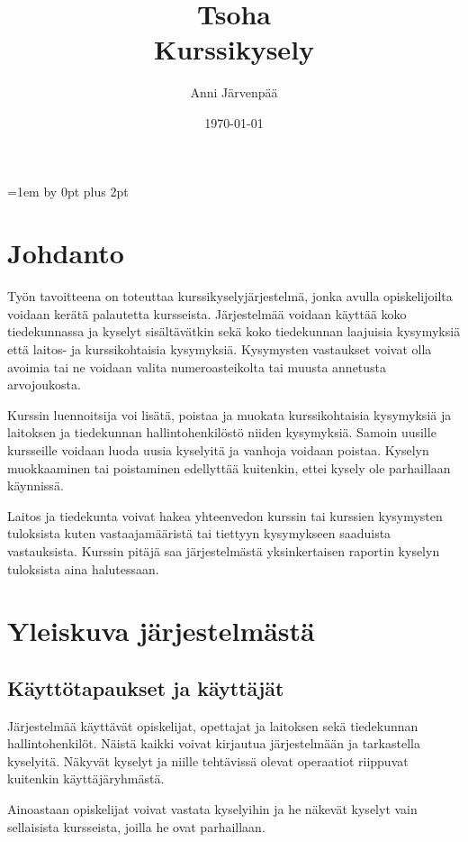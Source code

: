 \documentclass[12pt,a4paper,titlepage]{article}
\title{Tsoha\\ Kurssikysely \vspace{0.5em}}
\author{Anni Järvenpää}
\date{\today}
\begin{document}
\maketitle

\newpage
\tableofcontents
\thispagestyle{empty}
\newpage
\setcounter{page}{1}
\parskip=1em \advance\parskip by 0pt plus 2pt
\pagestyle{fancy}
\cfoot{\thepage}

\section{Johdanto}
Työn tavoitteena on toteuttaa kurssikyselyjärjestelmä, jonka avulla opiskelijoilta voidaan kerätä palautetta kursseista. Järjestelmää voidaan käyttää koko tiedekunnassa ja kyselyt sisältävätkin sekä koko tiedekunnan laajuisia kysymyksiä että laitos- ja kurssikohtaisia kysymyksiä. Kysymysten vastaukset voivat olla avoimia tai ne voidaan valita numeroasteikolta tai muusta annetusta arvojoukosta.

Kurssin luennoitsija voi lisätä, poistaa ja muokata kurssikohtaisia kysymyksiä ja laitoksen ja tiedekunnan hallintohenkilöstö niiden kysymyksiä. Samoin uusille kursseille voidaan luoda uusia kyselyitä ja vanhoja voidaan poistaa. Kyselyn muokkaaminen tai poistaminen edellyttää kuitenkin, ettei kysely ole parhaillaan käynnissä.

Laitos ja tiedekunta voivat hakea yhteenvedon kurssin tai kurssien kysymysten tuloksista kuten vastaajamääristä tai tiettyyn kysymykseen saaduista vastauksista. Kurssin pitäjä saa järjestelmästä yksinkertaisen raportin kyselyn tuloksista aina halutessaan.


\section{Yleiskuva järjestelmästä}
\subsection{Käyttötapaukset ja käyttäjät}
Järjestelmää käyttävät opiskelijat, opettajat ja laitoksen sekä tiedekunnan hallintohenkilöt. Näistä kaikki voivat kirjautua järjestelmään ja tarkastella kyselyitä. Näkyvät kyselyt ja niille tehtävissä olevat operaatiot riippuvat kuitenkin käyttäjäryhmästä.

Ainoastaan opiskelijat voivat vastata kyselyihin ja he näkevät kyselyt vain sellaisista kursseista, joilla he ovat parhaillaan.
\end{document}
